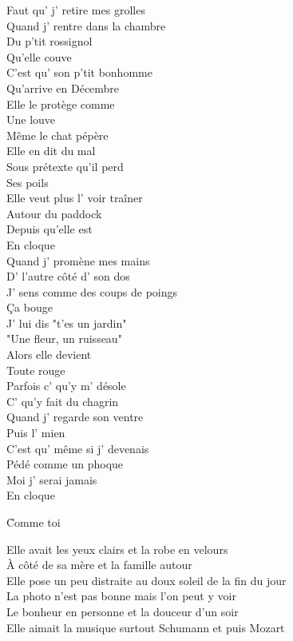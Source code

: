 \documentclass{novel}
\begin{document}
{\begin{minipage}[t][0.4\textheight][t]{\textwidth}
\begin{multicols}{3}
Faut qu' j' retire mes grolles \\
Quand j' rentre dans la chambre \\
Du p'tit rossignol \\
Qu'elle couve \\
C'est qu' son p'tit bonhomme \\
Qu'arrive en Décembre \\
Elle le protège comme \\
Une louve \\
Même le chat pépère \\
Elle en dit du mal \\
Sous prétexte qu'il perd \\
Ses poils \\
Elle veut plus l' voir traîner \\
Autour du paddock \\
Depuis qu'elle est \\
En cloque \\

Quand j' promène mes mains \\
D' l'autre côté d' son dos \\
J' sens comme des coups de poings \\
Ça bouge \\
J' lui dis "t'es un jardin" \\
"Une fleur, un ruisseau" \\
Alors elle devient \\
Toute rouge \\
Parfois c' qu'y m' désole \\
C' qu'y fait du chagrin \\
Quand j' regarde son ventre \\
Puis l' mien \\
C'est qu' même si j' devenais \\
Pédé comme un phoque \\
Moi j' serai jamais \\
En cloque \\

\end{multicols}
\end{minipage}

\vspace{0.08\textheight}
\begin{minipage}[t][0.65\textheight][t]{\textwidth}
\h*{Comme toi}
\begin{multicols}{2}
\footnotesize

Elle avait les yeux clairs et la robe en velours \\
À côté de sa mère et la famille autour \\
Elle pose un peu distraite au doux soleil de la fin du jour \\
La photo n'est pas bonne mais l'on peut y voir \\
Le bonheur en personne et la douceur d'un soir \\
Elle aimait la musique surtout Schumann et puis Mozart \\


\end{multicols}
\end{minipage}}
\end{document}
